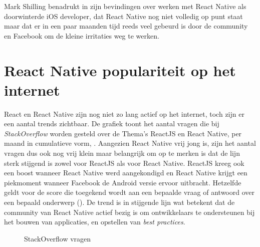 Mark Shilling benadrukt in zijn bevindingen over werken met React Native als doorwinterde iOS developer, dat React Native nog niet volledig op punt staat maar dat er in een paar maanden tijd reeds veel gebeurd is door de community en Facebook om de kleine irritaties weg te werken. 

\section{React Native populariteit op het internet}

React en React Native zijn nog niet zo lang actief op het internet, toch zijn er een aantal trends zichtbaar.
De grafiek  toont het aantal vragen die bij \emph{StackOverflow} worden gesteld over de Thema’s ReactJS en React Native, per maand in cumulatieve vorm, \citep{stack:data}. Aangezien React Native vrij jong is, zijn het aantal vragen dus ook nog vrij klein maar belangrijk om op te merken is dat de lijn sterk stijgend is zowel voor ReactJS als voor React Native. ReactJS kreeg ook een boost wanneer React Native werd aangekondigd en React Native krijgt een piekmoment wanneer Facebook de Android versie ervoor uitbracht. Hetzelfde geldt voor de score die toegekend wordt aan een bepaalde vraag of antwoord over een bepaald onderwerp (). De trend is in stijgende lijn wat betekent dat de community van React Native actief bezig is om ontwikkelaars te ondersteunen bij het bouwen van applicaties, en opstellen van \emph{best practices}. 
\begin{figure}
	\centering
	\caption{StackOverflow vragen \citep{stack:data}}
	\label{fig:questions}
\end{figure}
